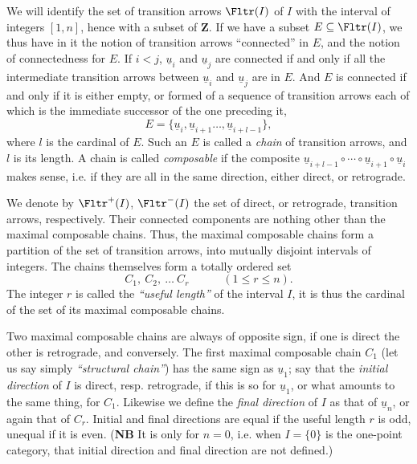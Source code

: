 We will identify the set of transition arrows $\Fltr(I)$ of $I$ with the interval of integers $[1,n]$, hence with a subset of $\mathbf{Z}$. If we have a subset $E\subseteq\Fltr(I)$, we thus have in it the notion of transition arrows ``connected'' in $E$, and the notion of connectedness for $E$. If $i<j$, $\underline{u}_i$ and $\underline{u}_j$ are connected if and only if all the intermediate transition arrows between $\underline{u}_i$ and $\underline{u}_j$ are in $E$. And $E$ is connected if and only if it is either empty, or formed of a sequence of transition arrows each of which is the immediate successor of the one preceding it, %
\[
E=\{\underline{u}_i,\underline{u}_{i+1}\ldots,\underline{u}_{i+l-1}\}, %
\]
where $l$ is the cardinal of $E$. Such an $E$ is called a \textit{chain} of transition arrows, and $l$ is its length. A chain is called \textit{composable} if the composite $\underline{u}_{i+l-1}\circ\cdots\circ\underline{u}_{i+1}\circ\underline{u}_i$ makes sense, i.e. if they are all in the same direction, either direct, or retrograde.

We denote by $\Fltr^+(I)$, $\Fltr^-(I)$ the set of direct, or retrograde, transition arrows, respectively. Their connected components are nothing other than the maximal composable chains. Thus, the maximal composable chains form a partition of the set of transition arrows, into mutually disjoint intervals of integers. The chains themselves form a totally ordered set
\[
C_1,\ C_2,\ \ldots\ C_r\qquad\quad(1\leq r\leq n).
\]
The integer $r$ is called the \textit{``useful length''} of the interval
$I$, it is thus the cardinal of the set of its maximal composable chains.

Two maximal composable chains are always of opposite sign, if one is direct the other is retrograde, and conversely. The first maximal composable chain $C_1$ (let us say simply \textit{``structural chain''}) has the same sign as $\underline{u}_1$; say that the \textit{initial direction} of $I$ is direct, resp. retrograde, if this is so for $\underline{u}_1$, or what amounts to the same thing, for $C_1$. Likewise we define the \textit{final direction} of $I$ as that of $\underline{u}_n$, or again that of $C_r$. Initial and final directions are equal if the useful length $r$ is
odd, unequal if it is even. (\textbf{NB} It is only for $n=0$, i.e. when $I=\{0\}$ is the one-point category, that initial direction and final direction are not defined.)

